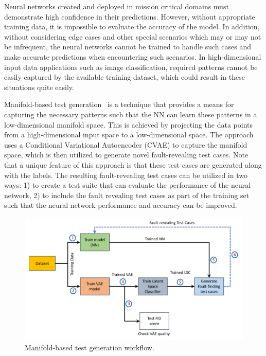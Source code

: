 Neural networks created and deployed in mission critical domains must demonstrate high confidence in their predictions. However, without appropriate training data, it is impossible to evaluate the accuracy of the model. In addition, without considering edge cases and other special scenarios which may or may not be infrequent, the neural networks cannot be trained to handle such cases and make accurate predictions when encountering such scenarios. In high-dimensional input data applications such as image classification, required patterns cannot be easily captured by the available training dataset, which could result in these situations quite easily. 

Manifold-based test generation~\cite{byun2020manifoldtestgen,byun2020manifoldassurance,byun2021black} is a technique that provides a means for capturing the necessary patterns such that the NN can learn these patterns in a low-dimensional manifold space. This is achieved by projecting the data points from a high-dimensional input space to a low-dimensional space. The approach uses a Conditional Variational Autoencoder (CVAE) to capture the manifold space, which is then utilized to generate novel fault-revealing test cases. Note that a unique feature of this approach is that these test cases are generated along with the labels. The resulting fault-revealing test cases can be utilized in two ways: 1) to create a test suite that can evaluate the performance of the neural network, 2) to include the fault revealing test cases as part of the training set such that the neural network performance and accuracy can be improved.

\begin{figure}[h]
	\includegraphics[width=\linewidth]{Fig/manifold_workflow.pdf}
	\caption{Manifold-based test generation workflow.}
	\label{fig:manifold_workflow}
\end{figure}


